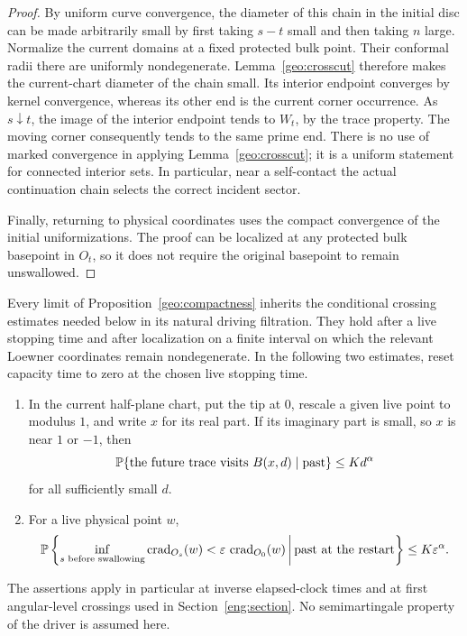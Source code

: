 \begin{proof}
By uniform curve convergence, the diameter of this chain in the
initial disc can be made arbitrarily small by first taking \(s-t\)
small and then taking \(n\) large. Normalize the current domains
at a fixed protected bulk point. Their conformal radii there are
uniformly nondegenerate. Lemma~\ref{geo:crosscut} therefore makes
the current-chart diameter of the chain small. Its interior
endpoint converges by kernel convergence, whereas its other end
is the current corner occurrence. As \(s\downarrow t\), the image
of the interior endpoint tends to \(W_t\), by the trace property.
The moving corner consequently tends to the same prime end.
There is no use of marked convergence in applying
Lemma~\ref{geo:crosscut}; it is a uniform statement for connected
interior sets. In particular, near a self-contact the actual
continuation chain selects the correct incident sector.

Finally, returning to physical coordinates uses the compact
convergence of the initial uniformizations. The proof can be
localized at any protected bulk basepoint in \(O_t\), so it does not
require the original basepoint to remain unswallowed.
\end{proof}

\begin{corollary}
\label{geo:restart}
Every limit of Proposition~\ref{geo:compactness} inherits the conditional
crossing estimates needed below in its natural driving filtration.
They hold after a live stopping time and after localization on a
finite interval on which the relevant Loewner coordinates remain
nondegenerate. In the following two estimates, reset capacity time
to zero at the chosen live stopping time.
\begin{enumerate}
\item In the current half-plane chart, put the tip at \(0\), rescale a
given live point to modulus \(1\), and write \(x\) for its real part.
If its imaginary part is small, so \(x\) is near \(1\) or \(-1\), then
\[
 \mathbb P\{\text{the future trace visits }B(x,d)\mid\text{past}\}
 \le Kd^\alpha
\]
for all sufficiently small \(d\).
\item For a live physical point \(w\),
\[
 \mathbb P\left\{
   \inf_{s\text{ before swallowing}}
   \operatorname{crad}_{O_s}(w)
      <\varepsilon\,\operatorname{crad}_{O_0}(w)
   \,\middle|\,\text{past at the restart}\right\}
 \le K\varepsilon^\alpha .
\]
\end{enumerate}
The assertions apply in particular at inverse elapsed-clock times
and at first angular-level crossings used in Section~\ref{eng:section}.
No semimartingale property of the driver is assumed here.
\end{corollary}

